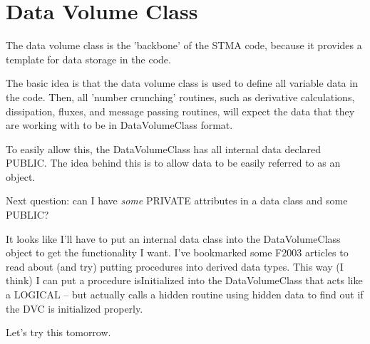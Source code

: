 \section{Data Volume Class}

The data volume class is the 'backbone' of the STMA code, because it
provides a template for data storage in the code.

The basic idea is that the data volume class is used to define all variable
data in the code.  Then, all 'number crunching' routines, such as derivative
calculations, dissipation, fluxes, and message passing routines, will expect
the data that they are working with to be in DataVolumeClass format.

To easily allow this, the DataVolumeClass has all internal data declared PUBLIC.
The idea behind this is to allow data to be easily referred to as an object.

Next question:  can I have \emph{some} PRIVATE attributes in a data class and
some PUBLIC?

It looks like I'll have to put an internal data class into the DataVolumeClass
object to get the functionality I want.  I've bookmarked some F2003 articles
to read about (and try) putting procedures into derived data types.  This way
(I think) I can put a procedure isInitialized into the DataVolumeClass that
acts like a LOGICAL -- but actually calls a hidden routine using hidden data
to find out if the DVC is initialized properly.

Let's try this tomorrow.
